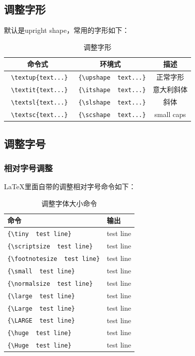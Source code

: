 \documentclass[11pt,oneside]{book}
\begin{document}
\subsection{调整字形}
默认是upright shape，常用的字形如下：
\begin{table}[H]
\centering
\label{tab:调整字形}
\begin{tabular}{|c|c|c|}
\hline
命令式 & 环境式 & 描述 \\
\hline
\verb+ \textup{text...}+ & \verb+ {\upshape  text...}+  & 正常字形 \\  
\verb+ \textit{text...}+ & \verb+ {\itshape  text...}+  & 意大利斜体 \\
\verb+ \textsl{text...}+ & \verb+ {\slshape  text...}+  & 斜体 \\
\verb+ \textsc{text...}+ & \verb+ {\scshape  text...}+  & small caps \\
\hline
\end{tabular}
\caption{调整字形}
\end{table}


\subsection{调整字号}

\subsubsection{相对字号调整}
\LaTeX 里面自带的调整相对字号命令如下：
\begin{table}[H]
\centering
\label{tab:调整字体大小命令}
\begin{tabular}{|l|l|}
\hline
命令 & 输出\\
\hline
\verb+{\tiny  test line}+ & {\tiny  test line}\\
\verb+{\scriptsize  test line}+ & {\scriptsize  test line}\\
\verb+{\footnotesize  test line}+ & {\footnotesize  test line}\\
\verb+{\small  test line}+ & {\small test line}\\
\verb+{\normalsize  test line}+ & {\normalsize  test line}\\
\verb+{\large  test line}+ & {\large  test line}\\
\verb+{\Large  test line}+ & {\Large  test line}\\
\verb+{\LARGE  test line}+ & {\LARGE  test line}\\
\verb+{\huge  test line}+ & {\huge  test line}\\
\verb+{\Huge  test line}+ & {\Huge  test line}\\
\hline
\end{tabular}
\caption{调整字体大小命令}
\end{table}
\end{document}
